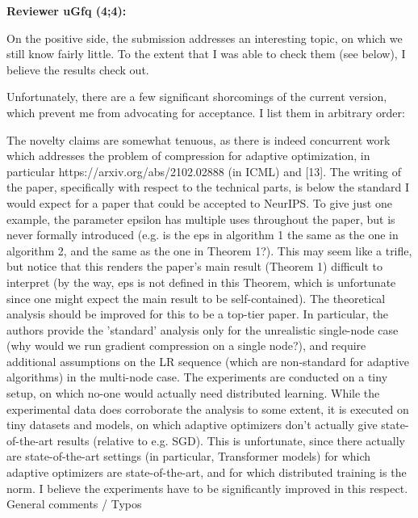 \documentclass{article}
\begin{document}
\textbf{Reviewer uGfq (4;4):}


On the positive side, the submission addresses an interesting topic, on which we still know fairly little. To the extent that I was able to check them (see below), I believe the results check out.

Unfortunately, there are a few significant shorcomings of the current version, which prevent me from advocating for acceptance. I list them in arbitrary order:

The novelty claims are somewhat tenuous, as there is indeed concurrent work which addresses the problem of compression for adaptive optimization, in particular https://arxiv.org/abs/2102.02888 (in ICML) and [13].
The writing of the paper, specifically with respect to the technical parts, is below the standard I would expect for a paper that could be accepted to NeurIPS. To give just one example, the parameter epsilon has multiple uses throughout the paper, but is never formally introduced (e.g. is the eps in algorithm 1 the same as the one in algorithm 2, and the same as the one in Theorem 1?). This may seem like a trifle, but notice that this renders the paper's main result (Theorem 1) difficult to interpret (by the way, eps is not defined in this Theorem, which is unfortunate since one might expect the main result to be self-contained).
The theoretical analysis should be improved for this to be a top-tier paper. In particular, the authors provide the 'standard' analysis only for the unrealistic single-node case (why would we run gradient compression on a single node?), and require additional assumptions on the LR sequence (which are non-standard for adaptive algorithms) in the multi-node case.
The experiments are conducted on a tiny setup, on which no-one would actually need distributed learning. While the experimental data does corroborate the analysis to some extent, it is executed on tiny datasets and models, on which adaptive optimizers don't actually give state-of-the-art results (relative to e.g. SGD). This is unfortunate, since there actually are state-of-the-art settings (in particular, Transformer models) for which adaptive optimizers are state-of-the-art, and for which distributed training is the norm. I believe the experiments have to be significantly improved in this respect.
General comments / Typos
\end{document}
